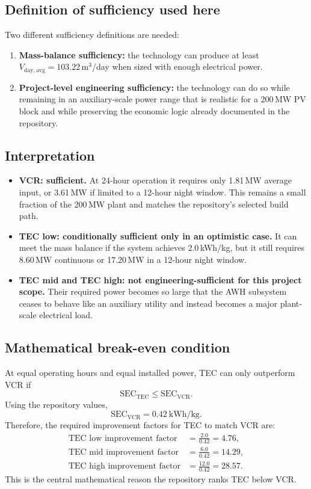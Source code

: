 \documentclass[11pt,a4paper]{article}
\begin{document}
\subsection{Definition of sufficiency used here}
Two different sufficiency definitions are needed:
\begin{enumerate}[leftmargin=*]
  \item \textbf{Mass-balance sufficiency:} the technology can produce at least $V_{\mathrm{day,avg}}=103.22$\,m$^3$/day when sized with enough electrical power.
  \item \textbf{Project-level engineering sufficiency:} the technology can do so while remaining in an auxiliary-scale power range that is realistic for a 200\,MW PV block and while preserving the economic logic already documented in the repository.
\end{enumerate}

\subsection{Interpretation}
\begin{itemize}[leftmargin=*]
  \item \textbf{VCR: sufficient.} At 24-hour operation it requires only 1.81\,MW average input, or 3.61\,MW if limited to a 12-hour night window. This remains a small fraction of the 200\,MW plant and matches the repository's selected build path.
  \item \textbf{TEC low: conditionally sufficient only in an optimistic case.} It can meet the mass balance if the system achieves 2.0\,kWh/kg, but it still requires 8.60\,MW continuous or 17.20\,MW in a 12-hour night window.
  \item \textbf{TEC mid and TEC high: not engineering-sufficient for this project scope.} Their required power becomes so large that the AWH subsystem ceases to behave like an auxiliary utility and instead becomes a major plant-scale electrical load.
\end{itemize}

\subsection{Mathematical break-even condition}
At equal operating hours and equal installed power, TEC can only outperform VCR if
\begin{equation}
\mathrm{SEC}_{\mathrm{TEC}} \le \mathrm{SEC}_{\mathrm{VCR}}.
\end{equation}
Using the repository values,
\begin{equation}
\mathrm{SEC}_{\mathrm{VCR}}=0.42\ \mathrm{kWh/kg}.
\end{equation}
Therefore, the required improvement factors for TEC to match VCR are:
\begin{align}
\text{TEC low improvement factor} &= \frac{2.0}{0.42}=4.76,\\
\text{TEC mid improvement factor} &= \frac{6.0}{0.42}=14.29,\\
\text{TEC high improvement factor} &= \frac{12.0}{0.42}=28.57.
\end{align}
This is the central mathematical reason the repository ranks TEC below VCR.
\end{document}
